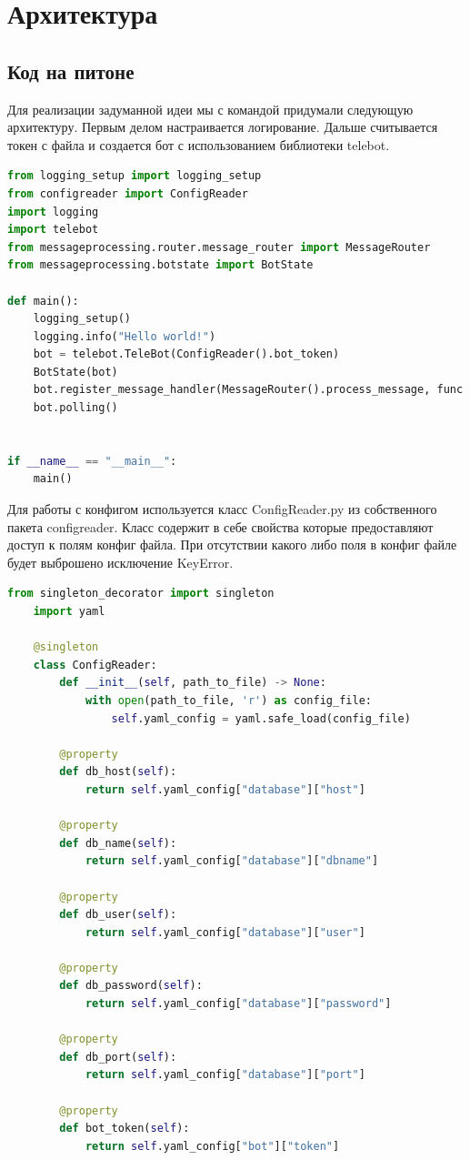 \documentclass[12pt]{extarticle}
\begin{document}
\section{Архитектура}
\subsection{Код на питоне}

Для реализации задуманной идеи мы с командой придумали следующую архитектуру. Первым делом настраивается логирование. Дальше считывается токен с файла и создается бот с использованием библиотеки telebot.
\begin{lstlisting}[language=Python,style=mystyle,caption=main.py]
from logging_setup import logging_setup
from configreader import ConfigReader
import logging
import telebot
from messageprocessing.router.message_router import MessageRouter
from messageprocessing.botstate import BotState

def main():
    logging_setup()
    logging.info("Hello world!")
    bot = telebot.TeleBot(ConfigReader().bot_token)
    BotState(bot)
    bot.register_message_handler(MessageRouter().process_message, func = lambda x: True)
    bot.polling()


if __name__ == "__main__":
    main()
\end{lstlisting}


Для работы с конфигом используется класс ConfigReader.py из собственного пакета configreader. Класс содержит в себе свойства которые предоставляют доступ к полям конфиг файла. При отсутствии какого либо поля в конфиг файле будет выброшено исключение KeyError.
\begin{lstlisting}[language=Python,style=mystyle,caption=ConfigReader.py]
    from singleton_decorator import singleton
    import yaml
    
    @singleton
    class ConfigReader:
        def __init__(self, path_to_file) -> None:
            with open(path_to_file, 'r') as config_file:
                self.yaml_config = yaml.safe_load(config_file)
    
        @property
        def db_host(self):
            return self.yaml_config["database"]["host"]
        
        @property
        def db_name(self):
            return self.yaml_config["database"]["dbname"]
        
        @property
        def db_user(self):
            return self.yaml_config["database"]["user"]
        
        @property
        def db_password(self):
            return self.yaml_config["database"]["password"]
        
        @property
        def db_port(self):
            return self.yaml_config["database"]["port"]
        
        @property
        def bot_token(self):
            return self.yaml_config["bot"]["token"]
    
\end{lstlisting}
\end{document}
